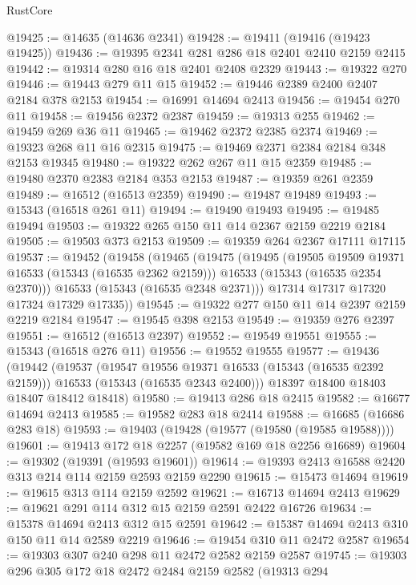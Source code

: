 \begin{lexlean}{RustCore}
\begin{coremodule}
@19425 := @14635 (@14636 @2341)
@19428 := @19411 (@19416 (@19423 @19425))
@19436 := @19395 @2341 @281 @286 @18 @2401 @2410 @2159 @2415
@19442 := @19314 @280 @16 @18 @2401 @2408 @2329
@19443 := @19322 @270
@19446 := @19443 @279 @11 @15
@19452 := @19446 @2389 @2400 @2407 @2184 @378 @2153
@19454 := @16991 @14694 @2413
@19456 := @19454 @270 @11
@19458 := @19456 @2372 @2387
@19459 := @19313 @255
@19462 := @19459 @269 @36 @11
@19465 := @19462 @2372 @2385 @2374
@19469 := @19323 @268 @11 @16 @2315
@19475 := @19469 @2371 @2384 @2184 @348 @2153 @19345
@19480 := @19322 @262 @267 @11 @15 @2359
@19485 := @19480 @2370 @2383 @2184 @353 @2153
@19487 := @19359 @261 @2359
@19489 := @16512 (@16513 @2359)
@19490 := @19487 @19489
@19493 := @15343 (@16518 @261 @11)
@19494 := @19490 @19493
@19495 := @19485 @19494
@19503 := @19322 @265 @150 @11 @14 @2367 @2159 @2219 @2184
@19505 := @19503 @373 @2153
@19509 := @19359 @264 @2367 @17111 @17115
@19537 := @19452
    (@19458
      (@19465
        (@19475
          (@19495
            (@19505 @19509 @19371 @16533 (@15343 (@16535 @2362 @2159)))
            @16533
            (@15343 (@16535 @2354 @2370)))
          @16533
          (@15343 (@16535 @2348 @2371)))
        @17314
        @17317
        @17320
        @17324
        @17329
        @17335))
@19545 := @19322 @277 @150 @11 @14 @2397 @2159 @2219 @2184
@19547 := @19545 @398 @2153
@19549 := @19359 @276 @2397
@19551 := @16512 (@16513 @2397)
@19552 := @19549 @19551
@19555 := @15343 (@16518 @276 @11)
@19556 := @19552 @19555
@19577 := @19436
    (@19442
      (@19537
        (@19547 @19556 @19371 @16533 (@15343 (@16535 @2392 @2159)))
        @16533
        (@15343 (@16535 @2343 @2400)))
      @18397
      @18400
      @18403
      @18407
      @18412
      @18418)
@19580 := @19413 @286 @18 @2415
@19582 := @16677 @14694 @2413
@19585 := @19582 @283 @18 @2414
@19588 := @16685 (@16686 @283 @18)
@19593 := @19403 (@19428 (@19577 (@19580 (@19585 @19588))))
@19601 := @19413 @172 @18 @2257 (@19582 @169 @18 @2256 @16689)
@19604 := @19302 (@19391 (@19593 @19601))
@19614 := @19393 @2413 @16588 @2420 @313 @214 @114 @2159 @2593 @2159 @2290
@19615 := @15473 @14694
@19619 := @19615 @313 @114 @2159 @2592
@19621 := @16713 @14694 @2413
@19629 := @19621 @291 @114 @312 @15 @2159 @2591 @2422 @16726
@19634 := @15378 @14694 @2413 @312 @15 @2591
@19642 := @15387 @14694 @2413 @310 @150 @11 @14 @2589 @2219
@19646 := @19454 @310 @11 @2472 @2587
@19654 := @19303 @307 @240 @298 @11 @2472 @2582 @2159 @2587
@19745 := @19303
    @296
    @305
    @172
    @18
    @2472
    @2484
    @2159
    @2582
    (@19313
      @294

\end{coremodule}
\end{lexlean}
